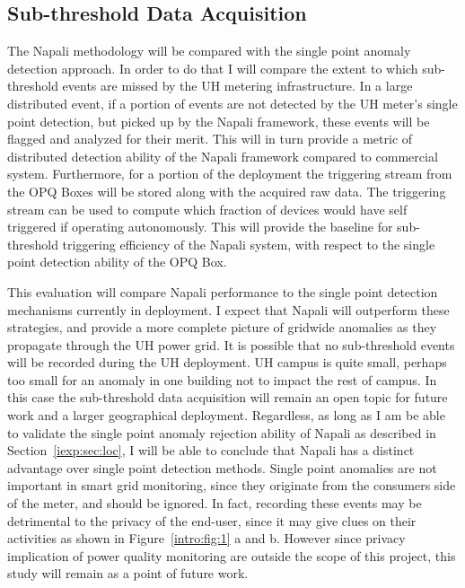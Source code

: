 \subsection{Sub-threshold Data Acquisition} \label{iexp:sec:sub}
The Napali methodology will be compared with the single point anomaly detection approach.
In order to do that I will compare the extent to which sub-threshold events are missed by the UH metering infrastructure.
In a large distributed event, if a portion of events are not detected by the UH meter's single point detection, but picked up by the Napali framework, these events will be flagged and analyzed for their merit.
This will in turn provide a metric of distributed detection ability of the Napali framework compared to commercial system.
Furthermore, for a portion of the deployment the triggering stream from the OPQ Boxes will be stored along with the acquired raw data.
The triggering stream can be used to compute which fraction of devices would have self triggered if operating autonomously.
This will provide the baseline for sub-threshold triggering efficiency of the Napali system, with respect to the single point detection ability of the OPQ Box.

This evaluation will compare Napali performance to the single point detection mechanisms currently in deployment.
I expect that Napali will outperform these strategies, and provide a more complete picture of gridwide anomalies as they propagate through the UH power grid.
It is possible that no sub-threshold events will be recorded during the UH deployment.
UH campus is quite small, perhaps too small for an anomaly in one building not to impact the rest of campus.
In this case the sub-threshold data acquisition will remain an open topic for future work and a larger geographical deployment.
Regardless, as long as I am be able to validate the single point anomaly rejection ability of Napali as described in Section~\ref{iexp:sec:loc}, I will be able to conclude that Napali has a distinct advantage over single point detection methods.
Single point anomalies are not important in smart grid monitoring, since they originate from the consumers side of the meter, and should be ignored.
In fact, recording these events may be detrimental to the privacy of the end-user, since it may give clues on their activities as shown in Figure~\ref{intro:fig:1} a and b.
However since privacy implication of power quality monitoring are outside the scope of this project, this study will remain as a point of future work.

